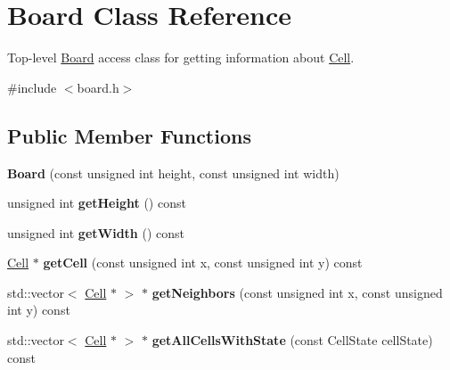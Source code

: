 \hypertarget{class_board}{}\section{Board Class Reference}
\label{class_board}


Top-\/level \hyperlink{class_board}{Board} access class for getting information about \hyperlink{class_cell}{Cell}.  




{\ttfamily \#include $<$board.\+h$>$}

\subsection*{Public Member Functions}
\begin{DoxyCompactItemize}
\item 
{\bfseries Board} (const unsigned int height, const unsigned int width)\hypertarget{class_board_ac2d6bdf52110ace6e23cd549f6161e6d}{}\label{class_board_ac2d6bdf52110ace6e23cd549f6161e6d}

\item 
unsigned int {\bfseries get\+Height} () const \hypertarget{class_board_adbe4819cf20cdbd0928ea872ded80fa1}{}\label{class_board_adbe4819cf20cdbd0928ea872ded80fa1}

\item 
unsigned int {\bfseries get\+Width} () const \hypertarget{class_board_aca1f1d7e7bfaf26f5ea8c80a0ea32e08}{}\label{class_board_aca1f1d7e7bfaf26f5ea8c80a0ea32e08}

\item 
\hyperlink{class_cell}{Cell} $\ast$ {\bfseries get\+Cell} (const unsigned int x, const unsigned int y) const \hypertarget{class_board_a462d2d88de065034690a157b5e3a7e2a}{}\label{class_board_a462d2d88de065034690a157b5e3a7e2a}

\item 
std\+::vector$<$ \hyperlink{class_cell}{Cell} $\ast$ $>$ $\ast$ {\bfseries get\+Neighbors} (const unsigned int x, const unsigned int y) const \hypertarget{class_board_ad87194acb6f107d2455734bb583deadd}{}\label{class_board_ad87194acb6f107d2455734bb583deadd}

\item 
std\+::vector$<$ \hyperlink{class_cell}{Cell} $\ast$ $>$ $\ast$ {\bfseries get\+All\+Cells\+With\+State} (const Cell\+State cell\+State) const \hypertarget{class_board_ad3e2d2c116f0b66293ac8be281875fef}{}\label{class_board_ad3e2d2c116f0b66293ac8be281875fef}

\end{DoxyCompactItemize}


